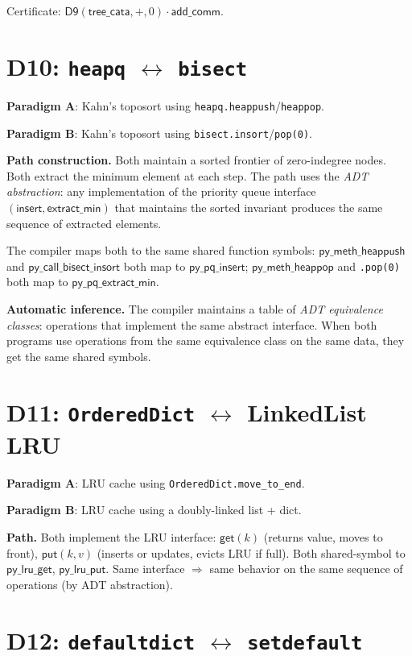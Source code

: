 \documentclass[11pt,a4paper]{report}
\theoremstyle{definition}
\theoremstyle{plain}
\begin{document}
Certificate: $\mathsf{D9}(\mathsf{tree\_cata}, +, 0) \cdot
\mathsf{add\_comm}$.

\section{D10: \texttt{heapq} $\leftrightarrow$ \texttt{bisect}}

\textbf{Paradigm A}: Kahn's toposort using \texttt{heapq.heappush}/\texttt{heappop}.

\textbf{Paradigm B}: Kahn's toposort using \texttt{bisect.insort}/\texttt{pop(0)}.

\textbf{Path construction.}
Both maintain a sorted frontier of zero-indegree nodes.  Both extract
the minimum element at each step.  The path uses the \emph{ADT
abstraction}: any implementation of the priority queue interface
$(\mathsf{insert}, \mathsf{extract\_min})$ that maintains the
sorted invariant produces the same sequence of extracted elements.

The compiler maps both to the same shared function symbols:
$\mathsf{py\_meth\_heappush}$ and $\mathsf{py\_call\_bisect\_insort}$
both map to $\mathsf{py\_pq\_insert}$; $\mathsf{py\_meth\_heappop}$
and \texttt{.pop(0)} both map to $\mathsf{py\_pq\_extract\_min}$.

\textbf{Automatic inference.}
The compiler maintains a table of \emph{ADT equivalence classes}:
operations that implement the same abstract interface.  When both
programs use operations from the same equivalence class on the
same data, they get the same shared symbols.

\section{D11: \texttt{OrderedDict} $\leftrightarrow$ LinkedList LRU}

\textbf{Paradigm A}: LRU cache using \texttt{OrderedDict.move\_to\_end}.

\textbf{Paradigm B}: LRU cache using a doubly-linked list + dict.

\textbf{Path.}
Both implement the LRU interface: $\mathsf{get}(k)$ (returns value,
moves to front), $\mathsf{put}(k, v)$ (inserts or updates, evicts
LRU if full).  Both shared-symbol to $\mathsf{py\_lru\_get}$,
$\mathsf{py\_lru\_put}$.  Same interface $\Rightarrow$ same behavior
on the same sequence of operations (by ADT abstraction).

\section{D12: \texttt{defaultdict} $\leftrightarrow$ \texttt{setdefault}}
\end{document}
